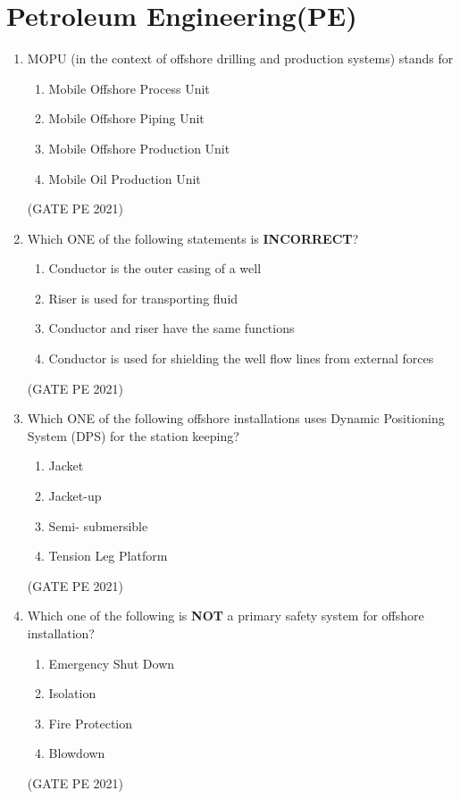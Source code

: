 \documentclass[journal,12pt,onecolumn]{IEEEtran}
\theoremstyle{remark}
\begin{document}
\section{\large\textbf{Petroleum Engineering(PE)}}

\begin{enumerate}
\item MOPU (in the context of offshore drilling and production systems) stands for
\begin{enumerate}
    \item Mobile Offshore Process Unit
    \item Mobile Offshore Piping Unit
    \item Mobile Offshore Production Unit
    \item Mobile Oil Production Unit
\end{enumerate}
\hfill{(GATE PE 2021)}

\item Which ONE of the following statements is \textbf{INCORRECT}?
\begin{enumerate}
    \item Conductor is the outer casing of a well
    \item Riser is used for transporting fluid
    \item Conductor and riser have the same functions
    \item Conductor is used for shielding the well flow lines from external forces
\end{enumerate}
\hfill{(GATE PE 2021)}

\item Which ONE of the following offshore installations uses Dynamic Positioning System (DPS) for the station keeping?
\begin{enumerate}
    \item Jacket 
    \item Jacket-up
    \item Semi- submersible
    \item Tension Leg Platform
\end{enumerate}
\hfill{(GATE PE 2021)}

\item  Which one of the following is \textbf{NOT} a primary safety system for offshore installation?
\begin{enumerate}
    \item Emergency Shut Down
    \item Isolation
    \item Fire Protection
    \item Blowdown
\end{enumerate}
\hfill{(GATE PE 2021)}


\end{enumerate}
\end{document}
